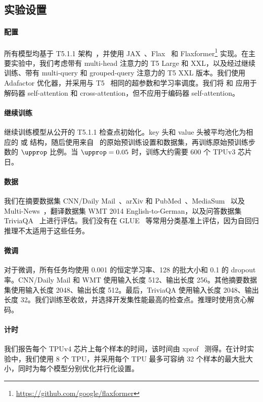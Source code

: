 \documentclass[11pt]{article}
\begin{document}
\subsection{实验设置}

\paragraph{配置}
所有模型均基于 T5.1.1 架构~\citep{t5}，并使用 JAX~\citep{jax}、Flax~\citep{flax} 和 Flaxformer\footnote{\url{https://github.com/google/flaxformer}} 实现。在主要实验中，我们考虑带有 multi-head 注意力的 T5 Large 和 XXL，以及经过继续训练、带有 multi-query 和 grouped-query 注意力的 T5 XXL 版本。我们使用 Adafactor 优化器，并采用与 T5~\citep{t5} 相同的超参数和学习率调度。我们将 \mq 和 \gmq 应用于解码器 self-attention 和 cross-attention，但不应用于编码器 self-attention。

\paragraph{继续训练}

继续训练模型从公开的 T5.1.1 检查点初始化。key 头和 value 头被平均池化为相应的 \mq 或 \gmq 结构，随后使用来自~\citep{t5} 的原始预训练设置和数据集，再训练原始预训练步数的 $\upprop$ 比例。当 $\upprop=0.05$ 时，训练大约需要 600 个 TPUv3 芯片日。

\paragraph{数据}
我们在摘要数据集 CNN/Daily Mail~\citep{cnn}、arXiv 和 PubMed~\citep{arxiv}、MediaSum~\citep{mediasum} 以及 Multi-News~\citep{multinews}，翻译数据集 WMT 2014 English-to-German，以及问答数据集 TriviaQA~\citep{triviaqa} 上进行评估。我们没有在 GLUE~\citep{glue} 等常用分类基准上评估，因为自回归推理不太适用于这些任务。

\paragraph{微调}

对于微调，所有任务均使用 0.001 的恒定学习率、128 的批大小和 0.1 的 dropout 率。CNN/Daily Mail 和 WMT 使用输入长度 512、输出长度 256。其他摘要数据集使用输入长度 2048、输出长度 512。最后，TriviaQA 使用输入长度 2048、输出长度 32。我们训练至收敛，并选择开发集性能最高的检查点。推理时使用贪心解码。

\paragraph{计时}
我们报告每个 TPUv4 芯片上每个样本的时间，该时间由 xprof~\citep{xprof} 测得。在计时实验中，我们使用 8 个 TPU，并采用每个 TPU 最多可容纳 32 个样本的最大批大小，同时为每个模型分别优化并行化设置。


\end{document}
